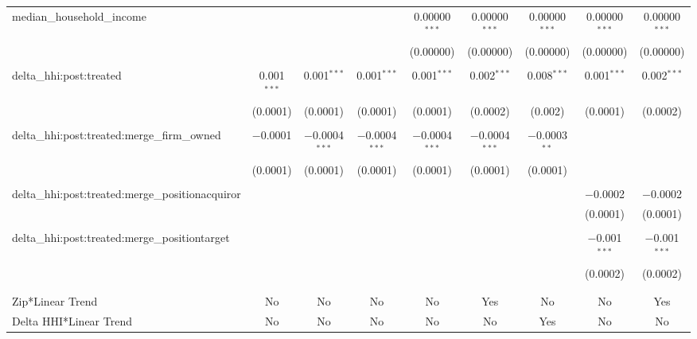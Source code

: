 \begin{table}[H]
{\begin{tabular}{@{\extracolsep{5pt}}lcccccccc}
  median\_household\_income &  &  &  & 0.00000$^{***}$ & 0.00000$^{***}$ & 0.00000$^{***}$ & 0.00000$^{***}$ & 0.00000$^{***}$ \\  

   &  &  &  & (0.00000) & (0.00000) & (0.00000) & (0.00000) & (0.00000) \\  

   & & & & & & & & \\  

  delta\_hhi:post:treated & 0.001$^{***}$ & 0.001$^{***}$ & 0.001$^{***}$ & 0.001$^{***}$ & 0.002$^{***}$ & 0.008$^{***}$ & 0.001$^{***}$ & 0.002$^{***}$ \\  

   & (0.0001) & (0.0001) & (0.0001) & (0.0001) & (0.0002) & (0.002) & (0.0001) & (0.0002) \\  

   & & & & & & & & \\  

  delta\_hhi:post:treated:merge\_firm\_owned & $-$0.0001 & $-$0.0004$^{***}$ & $-$0.0004$^{***}$ & $-$0.0004$^{***}$ & $-$0.0004$^{***}$ & $-$0.0003$^{**}$ &  &  \\  

   & (0.0001) & (0.0001) & (0.0001) & (0.0001) & (0.0001) & (0.0001) &  &  \\  

   & & & & & & & & \\  

  delta\_hhi:post:treated:merge\_positionacquiror &  &  &  &  &  &  & $-$0.0002 & $-$0.0002 \\  

   &  &  &  &  &  &  & (0.0001) & (0.0001) \\  

   & & & & & & & & \\  

  delta\_hhi:post:treated:merge\_positiontarget &  &  &  &  &  &  & $-$0.001$^{***}$ & $-$0.001$^{***}$ \\  

   &  &  &  &  &  &  & (0.0002) & (0.0002) \\  

   & & & & & & & & \\  

 \hline \\[-1.8ex]  

 Zip*Linear Trend & No & No & No & No & Yes & No & No & Yes \\  

 Delta HHI*Linear Trend & No & No & No & No & No & Yes & No & No \\  


\end{tabular}}
\end{table}
